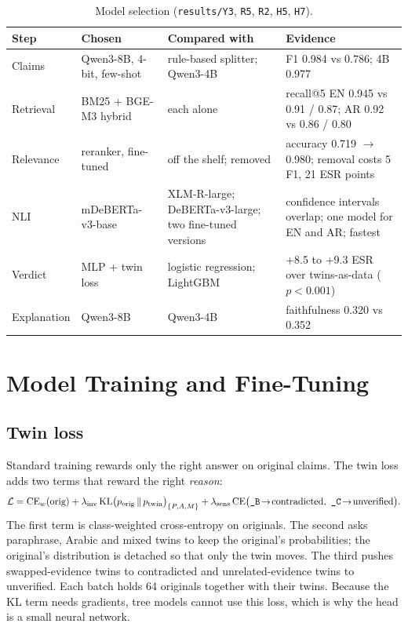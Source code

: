 \documentclass[11pt,a4paper]{article}
\newcommand{\tw}[1]{\texttt{\_#1}}          %
\begin{document}
\begin{table}[t]
\centering\small
\caption{Model selection (\texttt{results/Y3}, \texttt{R5}, \texttt{R2}, \texttt{H5}, \texttt{H7}).}
\label{tab:choices}
\begin{tabularx}{\textwidth}{@{}l l X X@{}}
\toprule
Step & Chosen & Compared with & Evidence \\
\midrule
Claims & Qwen3-8B, 4-bit, few-shot & rule-based splitter; Qwen3-4B & F1 0.984 vs 0.786; 4B 0.977 \\
Retrieval & BM25 + BGE-M3 hybrid & each alone & recall@5 EN 0.945 vs 0.91 / 0.87; AR 0.92 vs 0.86 / 0.80 \\
Relevance & reranker, fine-tuned & off the shelf; removed & accuracy 0.719 $\rightarrow$ 0.980; removal costs 5 F1, 21 ESR points \\
NLI & mDeBERTa-v3-base & XLM-R-large; DeBERTa-v3-large; two fine-tuned versions & confidence intervals overlap; one model for EN and AR; fastest \\
Verdict & MLP + twin loss & logistic regression; LightGBM & +8.5 to +9.3 ESR over twins-as-data ($p<0.001$) \\
Explanation & Qwen3-8B & Qwen3-4B & faithfulness 0.320 vs 0.352 \\
\bottomrule
\end{tabularx}
\end{table}

\section{Model Training and Fine-Tuning}

\subsection{Twin loss}
Standard training rewards only the right answer on original claims. The twin loss adds two terms that reward the right \emph{reason}:
\begin{equation}
\mathcal{L} = \mathrm{CE}_w(\text{orig}) + \lambda_{\text{inv}}\,\mathrm{KL}\big(p_{\text{orig}} \,\|\, p_{\text{twin}}\big)_{\{P,A,M\}} + \lambda_{\text{sens}}\,\mathrm{CE}\big(\text{\tw{B}}\!\rightarrow\!\text{contradicted},\ \text{\tw{C}}\!\rightarrow\!\text{unverified}\big).
\end{equation}
The first term is class-weighted cross-entropy on originals. The second asks paraphrase, Arabic and mixed twins to keep the original's probabilities; the original's distribution is detached so that only the twin moves. The third pushes swapped-evidence twins to contradicted and unrelated-evidence twins to unverified. Each batch holds 64 originals together with their twins. Because the KL term needs gradients, tree models cannot use this loss, which is why the head is a small neural network.
\end{document}

